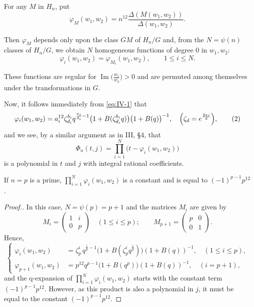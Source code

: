 For any $M$ in $H_{n}$, put
\[
\varphi_{M}(w_{1},w_{2})=n^{12}\frac{\Delta(M(w_{1},w_{2}))}{\Delta(w_{1},w_{2})}.
\]

Then $\varphi_{M}$ depends only upon the class $GM$ of $H_{n}/G$ and,
from the $N=\psi(n)$ classes of $H_{n}/G$, we obtain $N$ homogeneous
functions of degree $0$ in $w_{1},w_{2}$:
\[
\varphi_{i}(w_{1},w_{2})=\varphi_{M_{i}}(w_{1},w_{2}),\qquad
1\leq i\leq N.
\]

These functions are regular for $\operatorname{Im}\bigl(\frac{w_{1}}{w_{2}}\bigr)>0$
and are permuted among themselves under the transformations in $G$.

Now, it follows immediately from \eqref{eq:IV-1} that
\[
\varphi_{i}(w_{1},w_{2})
=a_{i}^{12}\zeta_{d_{i}}^{b_{i}}q^{\frac{a_{i}}{d_{i}}-1}
\bigl(1+B(\zeta_{d_{i}}^{b_{i}}q)\bigr)\bigl(1+B(q)\bigr)^{-1},
\quad\Bigl(\zeta_{d}=e^{\frac{2\pi i}{d}}\Bigr),
\tag{2}\label{eq:IV-2}
\]
and we see, by a similar argument as in III, §4, that
\[
\Phi_{n}(t,j)=\prod_{i=1}^{N}\bigl(t-\varphi_{i}(w_{1},w_{2})\bigr)
\]
is a polynomial in $t$ and $j$ with integral rational coefficients.

\begin{lemma}\label{lem:IV-1}
If $n=p$ is a prime, $\prod_{i=1}^{N}\varphi_{i}(w_{1},w_{2})$ is a
constant and is equal to $(-1)^{p-1}p^{12}$.
\end{lemma}

\begin{proof}[Proof.]
In this case, $N=\psi(p)=p+1$ and the matrices $M_{i}$ are given by
\[
M_{i}=
\begin{pmatrix}1&i\\ 0&p\end{pmatrix}\quad(1\leq i\leq p);\qquad
M_{p+1}=
\begin{pmatrix}p&0\\ 0&1\end{pmatrix}.
\]
Hence,
\[
\left\{
\begin{aligned}
\varphi_{i}(w_{1},w_{2})
&=\zeta_{p}^{i}\,q^{\frac{1}{p}-1}
\bigl(1+B(\zeta_{p}^{i}q^{\frac{1}{p}})\bigr)
(1+B(q))^{-1},\quad(1\leq i\leq p),\\[3pt]
\varphi_{p+1}(w_{1},w_{2})
&=p^{12}q^{p-1}\bigl(1+B(q^{p})\bigr)(1+B(q))^{-1},
\quad(i=p+1),
\end{aligned}\right.
\tag{3}\label{eq:IV-3}
\]
and the q-expansion of $\prod_{i=1}^{N}\varphi_{i}(w_{1},w_{2})$ starts
with the constant term $(-1)^{p-1}p^{12}$. However, as this product is
also a polynomial in $j$, it must be equal to the constant
$(-1)^{p-1}p^{12}$.
\end{proof}

